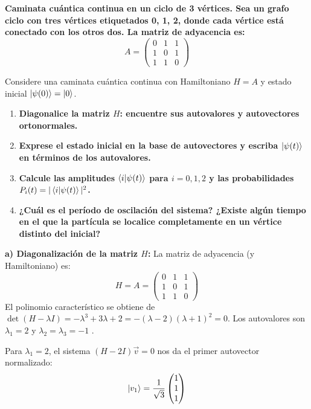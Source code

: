{\bfseries Caminata cuántica continua en un ciclo de 3 vértices. 
Sea un grafo ciclo con tres vértices etiquetados 0, 1, 2, donde cada vértice está conectado con los otros dos.  
La matriz de adyacencia es: 
\begin{equation*}
A = \begin{pmatrix} 0 & 1 & 1 \\ 1 & 0 & 1 \\ 1 & 1 & 0 \end{pmatrix} 
\end{equation*}

Considere una caminata cuántica continua con Hamiltoniano $H = A$ y estado inicial $\ket{\psi(0)} =
\ket{0}$.} 

\begin{enumerate}
    \item[a)] {\bfseries Diagonalice la matriz $H$: encuentre sus autovalores y autovectores
        ortonormales. }
    \item[b)] {\bfseries Exprese el estado inicial en la base de autovectores y escriba
        $\ket{\psi(t)}$ en términos de los autovalores. }
    \item[c)] {\bfseries Calcule las amplitudes $\bra{i}\ket{\psi(t)}$ para $i=0, 1, 2$ y las
        probabilidades $P_i(t) = |\bra{i}\ket{\psi(t)}|^2$. }
    \item[d)] {\bfseries ¿Cuál es el período de oscilación del sistema? ¿Existe algún tiempo en el
        que la partícula se localice completamente en un vértice distinto del inicial? }
\end{enumerate}

\textbf{a) Diagonalización de la matriz $H$:}
La matriz de adyacencia (y Hamiltoniano) es:
\begin{equation*}
H = A = \begin{pmatrix} 0 & 1 & 1 \\ 1 & 0 & 1 \\ 1 & 1 & 0 \end{pmatrix}
\end{equation*}
El polinomio característico se obtiene de $\det(H - \lambda I) = -\lambda^3 + 3\lambda + 2 = -(\lambda - 2)(\lambda + 1)^2 = 0$.
Los autovalores son $\lambda_1 = 2$  y $\lambda_2 = \lambda_3 = -1$ .

Para $\lambda_1 = 2$, el sistema $(H - 2I)\vec{v} = 0$ nos da el primer autovector normalizado:
\begin{equation*}
\ket{v_1} = \frac{1}{\sqrt{3}}\begin{pmatrix} 1 \\ 1 \\ 1 \end{pmatrix}
\end{equation*}


